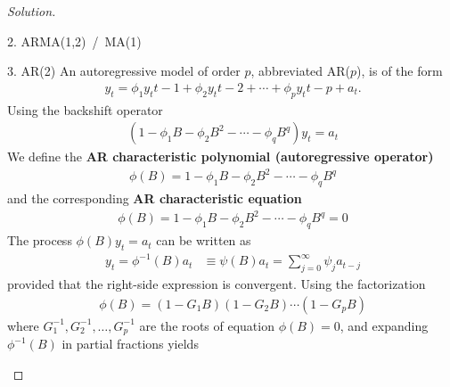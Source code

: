 \documentclass[UTF8,a4paper,14pt]{ctexart}
\newenvironment{solution}
  {\renewcommand\qedsymbol{$\blacksquare$}\begin{proof}[Solution]}
  {\end{proof}}
\theoremstyle{definition}
\theoremstyle{remark}
\begin{document}
\begin{solution}
\begin{mybox}{2. ARMA(1,2) \,/\, MA(1)}
    
  \end{mybox}
  \pagebreak

  \begin{mybox}{3. AR(2)}
    An autoregressive model of order \(p\), abbreviated AR(\(p\)), is of the form
    \begin{equation}\
      \begin{aligned}
        y_t = \phi_1 y_t{t-1}+\phi_2 y_t{t-2} +\cdots+\phi_p y_t{t-p}+a_t.
      \end{aligned}
    \end{equation}
    Using the backshift operator
    \begin{equation}\
      \begin{aligned}
        (1-\phi_1 B -\phi_2 B^2 -\cdots-\phi_{q}B^{q}) y_t = a_t 
      \end{aligned}
    \end{equation}  
    We define the \textbf{AR characteristic polynomial (autoregressive operator)}
    \begin{equation}\
      \begin{aligned}
       \phi(B) = 1-\phi_1 B -\phi_2 B^2 -\cdots-\phi_{q}B^{q}
      \end{aligned}
    \end{equation}
    and the corresponding \textbf{AR characteristic equation}
    \begin{equation}\
      \begin{aligned}
       \phi(B) = 1-\phi_1 B -\phi_2 B^2 -\cdots-\phi_{q}B^{q} = 0
      \end{aligned}
    \end{equation}
    The process \(\phi(B)y_t = a_t  \) can be written as
    \begin{equation}\
      \begin{aligned}
        y_t =\phi^{-1}(B) a_t
        &\equiv \psi (B) a_t
        = \sum_{j = 0}^{\infty}  \psi_ja_{t-j}
      \end{aligned}
    \end{equation}
    provided that the right-side expression is convergent. Using the factorization
    \begin{equation}\
      \begin{aligned}
        \phi(B) = (1-G_1 B)(1-G_2 B)\cdots(1-G_p B)
      \end{aligned}
    \end{equation}
    where \(G_1^{-1}, G_2^{-1},\ldots, G_p^{-1}\) are the roots of equation \(\phi(B) = 0\), and expanding \(\phi^{-1}(B)\) in partial fractions yields

\end{mybox}
\end{solution}
\end{document}
